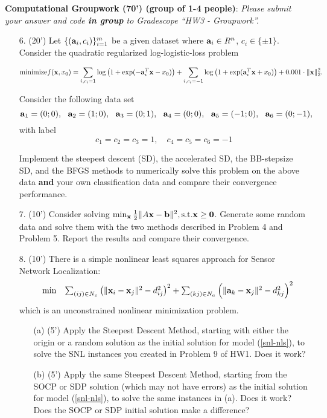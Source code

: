 \documentclass[12pt,letterpaper]{article}
\renewcommand\a{{\bf a}}
\renewcommand\b{{\bf b}}
\newcommand\x{{\bf x}}
\newcommand\bz{{\bf 0}}
\begin{document}
\clearpage
\textbf{Computational Groupwork (70')  (group of 1-4 people)}:
\emph{Please submit your answer and code \textbf{in group} to Gradescope ``HW3 - Groupwork''.}

\begin{enumerate}
\item[6.] (20') Let $\{(\a_i, c_i)\}_{i=1}^m$ be a given dataset where $\a_i \in R^n$, $c_i \in \{\pm 1\}$. Consider the quadratic regularized log-logistic-loss problem
\begin{small} 
\[
\mathrm{minimize} f(\x,x_0)=\sum_{i,c_i=1}\log\left(1+\exp(-\a_i^T\x-x_0)\right)+\sum_{i,c_i=-1}\log\left(1+\exp(\a_i^T\x+x_0)\right) + 0.001 \cdot \|\x\|_2^2.
\]
\end{small}
 Consider the following data set
\[
	\a_1 = (0;0),~~ \a_2 = (1;0),~~ \a_3 = (0;1),~~ \a_4 = (0;0),~~ \a_5 = (-1;0),~~\a_6 = (0;-1),
\]
with label
\[
	c_1 = c_2 = c_3 = 1, \quad c_4 = c_5 = c_6 = -1
\]

Implement the steepest descent (SD), the accelerated SD, the BB-stepsize SD, and the BFGS methods to numerically solve this problem on the above data \textbf{and} your own classification data and compare their convergence performance.
 
\item[7.] (10') 
Consider solving $\min_{\x} \frac{1}{2}\|A\x-\b\|^2, \mathrm{s.t.} \x \geq \bz$. Generate some random data and solve them with the two methods described in Problem 4 and Problem 5. Report the results and compare their convergence.

\item[8.] (10')
There is a simple nonlinear least squares approach for Sensor Network Localization:
\begin{equation}\label{snl-nls}
\begin{array}{lll}
&\min        & \sum_{(ij)\in N_x}\left(\|\x_i-\x_j\|^2 - d_{ij}^2\right)^2+\sum_{(kj)\in N_a} \left(\|\a_k-\x_j\|^2 - d_{kj}^2\right)^2
\end{array}
\end{equation}
which is an unconstrained nonlinear minimization problem.

\begin{itemize}
\item[(a)] (5') Apply the Steepest Descent Method, starting with either the origin or a random solution as the initial solution for model (\ref{snl-nls}), to solve the SNL instances you created in Problem 9 of HW1. Does it work?

\item[(b)] (5') Apply the same Steepest Descent Method, starting from the SOCP or SDP solution (which may not have errors) as the initial solution for model (\ref{snl-nls}), to solve the same instances in (a). Does it work? Does the SOCP or SDP initial solution make a difference?
\end{itemize}


\end{enumerate}
\end{document}
